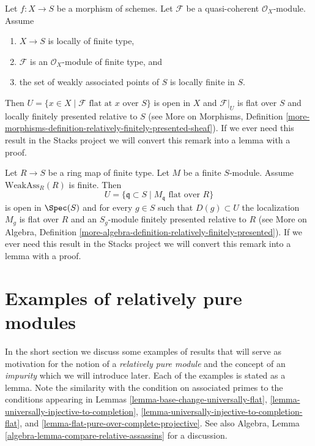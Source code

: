 \begin{remark}
\label{remark-finite-type-flat}
Let $f : X \to S$ be a morphism of schemes.
Let $\mathcal{F}$ be a quasi-coherent $\mathcal{O}_X$-module.
Assume
\begin{enumerate}
\item $X \to S$ is locally of finite type,
\item $\mathcal{F}$ is an $\mathcal{O}_X$-module of finite type, and
\item the set of weakly associated points of $S$ is locally finite in $S$.
\end{enumerate}
Then $U = \{x \in X \mid \mathcal{F}\text{ flat at }x\text{ over }S\}$
is open in $X$ and $\mathcal{F}|_U$ is flat over $S$ and locally
finitely presented relative to $S$ (see
More on Morphisms, Definition
\ref{more-morphisms-definition-relatively-finitely-presented-sheaf}).
If we ever need this result in the Stacks project we will convert
this remark into a lemma with a proof.
\end{remark}

\begin{remark}
\label{remark-finite-type-flat-algebra}
Let $R \to S$ be a ring map of finite type.
Let $M$ be a finite $S$-module.
Assume $\text{WeakAss}_R(R)$ is finite.
Then
$$
U = \{\mathfrak q \subset S \mid M_{\mathfrak q}\text{ flat over }R\}
$$
is open in $\Spec(S)$ and for every $g \in S$ such that
$D(g) \subset U$ the localization $M_g$ is flat over $R$ and
an $S_g$-module finitely presented relative to $R$ (see
More on Algebra, Definition
\ref{more-algebra-definition-relatively-finitely-presented}).
If we ever need this result in the Stacks project we will convert
this remark into a lemma with a proof.
\end{remark}









\section{Examples of relatively pure modules}
\label{section-examples-pure-modules}

\noindent
In the short section we discuss some examples of results that will serve
as motivation for the notion of a {\it relatively pure module} and the
concept of an {\it impurity} which we will introduce later. Each of the
examples is stated as a lemma. Note the similarity with the condition on
associated primes to the conditions appearing in
Lemmas \ref{lemma-base-change-universally-flat},
\ref{lemma-universally-injective-to-completion},
\ref{lemma-universally-injective-to-completion-flat}, and
\ref{lemma-flat-pure-over-complete-projective}.
See also
Algebra, Lemma \ref{algebra-lemma-compare-relative-assassins}
for a discussion.

